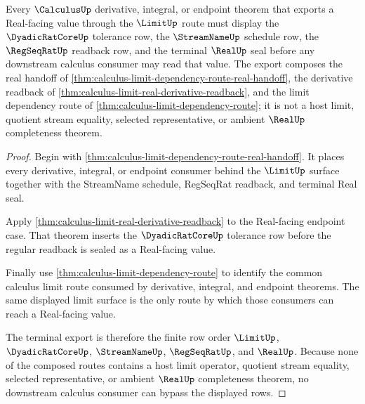 \begin{theorem}
\label{thm:calculus-limit-real-terminal-export}
Every $\CalculusUp$ derivative, integral, or endpoint theorem that exports a Real-facing value through the $\LimitUp$ route must display the $\DyadicRatCoreUp$ tolerance row, the $\StreamNameUp$ schedule row, the $\RegSeqRatUp$ readback row, and the terminal $\RealUp$ seal before any downstream calculus consumer may read that value. The export composes the real handoff of \autoref{thm:calculus-limit-dependency-route-real-handoff}, the derivative readback of \autoref{thm:calculus-limit-real-derivative-readback}, and the limit dependency route of \autoref{thm:calculus-limit-dependency-route}; it is not a host limit, quotient stream equality, selected representative, or ambient $\RealUp$ completeness theorem.
\end{theorem}
\begin{proof}
Begin with \autoref{thm:calculus-limit-dependency-route-real-handoff}. It places every derivative, integral, or endpoint consumer behind the $\LimitUp$ surface together with the StreamName schedule, RegSeqRat readback, and terminal Real seal.

Apply \autoref{thm:calculus-limit-real-derivative-readback} to the Real-facing endpoint case. That theorem inserts the $\DyadicRatCoreUp$ tolerance row before the regular readback is sealed as a Real-facing value.

Finally use \autoref{thm:calculus-limit-dependency-route} to identify the common calculus limit route consumed by derivative, integral, and endpoint theorems. The same displayed limit surface is the only route by which those consumers can reach a Real-facing value.

The terminal export is therefore the finite row order $\LimitUp$, $\DyadicRatCoreUp$, $\StreamNameUp$, $\RegSeqRatUp$, and $\RealUp$. Because none of the composed routes contains a host limit operator, quotient stream equality, selected representative, or ambient $\RealUp$ completeness theorem, no downstream calculus consumer can bypass the displayed rows.
\end{proof}
